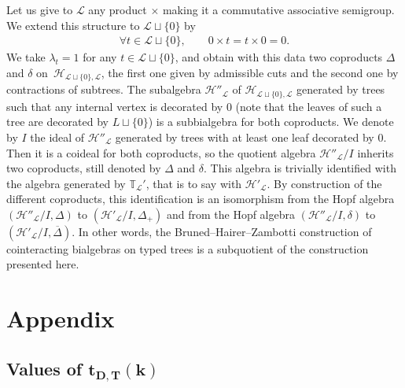 \documentclass[pdftex]{sigma}
\numberwithin{equation}{section}
\renewcommand{\L}{\mathcal{L}}
\newcommand{\h}{\mathcal{H}}
\newcommand{\bfT}{\mathbb{T}}
\begin{document}
Let us give to $\L$ any product $\times$ making it a commutative associative semigroup.
We extend this structure to $\L\sqcup \{0\}$ by
\begin{gather*}
\forall t\in \L\sqcup \{0\},\qquad 0\times t=t\times 0=0.
\end{gather*}
We take $\lambda_t=1$ for any $t\in \L\sqcup\{0\}$, and obtain with this data two coproducts
$\Delta$ and $\delta$ on~$\h_{\L\sqcup\{0\}, \L}$, the first one given by admissible cuts and the second one by contractions
of subtrees. The subalgebra $\h''_\L$ of $\h_{\L\sqcup\{0\}, \L}$ generated by trees such that any internal vertex
is decorated by $0$ (note that the leaves of such a tree are decorated by $L\sqcup \{0\}$) is a subbialgebra for both coproducts.
We denote by $I$ the ideal of $\h''_\L$ generated by trees with at least one leaf decorated by $0$.
Then it is a coideal for both coproducts, so the quotient algebra $\h''_\L/I$ inherits two coproducts, still denoted by $\Delta$
and $\delta$. This algebra is trivially identified with the algebra generated by $\bfT_\L'$, that is to say
with $\h'_\L$. By construction of the different coproducts, this identification is an isomorphism from the Hopf algebra
$(\h''_\L/I,\Delta)$ to $(\h'_\L/I,\Delta_+)$ and from the Hopf algebra $(\h''_\L/I,\delta)$ to $(\h'_\L/I,\overline{\Delta})$.
In other words, the Bruned--Hairer--Zambotti construction of cointeracting bialgebras on typed trees is a subquotient
of the construction presented here.

\section{Appendix}

\subsection[Values of t D,T(k)]{Values of $\boldsymbol{t_{D,T}(k)}$}
\end{document}

